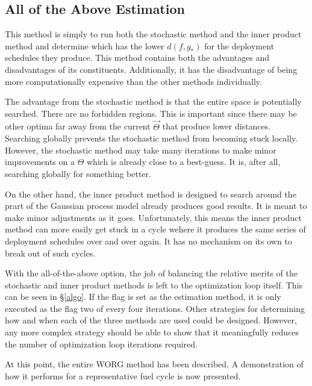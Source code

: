 \subsection{All of the Above Estimation}
\label{all}

This method is simply to run both the stochastic method and the inner product
method and determine which has the lower $d(f, g_*)$ for the deployment 
schedules they produce.  This method contains both the advantages and 
disadvantages of its constituents.  Additionally, it has the disadvantage 
of being more computationally expensive than the other methods individually.

The advantage from the stochastic method is that the entire space is 
potentially searched. There are no forbidden regions.
This is important since there may be other
optima far away from the current $\vec{\Theta}$ that produce lower distances.
Searching globally prevents the stochastic method from becoming stuck locally.
However, the stochastic method may take many iterations to 
make minor improvements on a $\Theta$ which is already close to a best-guess.
It is, after all, searching globally for something better.

On the other hand, the inner product method is designed to search around 
the prart of the Gaussian process model already produces good results. It
is meant to make minor adjustments as it goes.  Unfortunately, this means
the inner product method can more easily get stuck in a cycle  wehere it 
produces the same series of deployment schedules over and over again. 
It has no mechanism on its own to break out of such cycles.

With the all-of-the-above option, the job of balancing the relative merits
of the stochastic and inner product methods is left to the optimization 
loop itself.  This can be seen in \S\ref{algo}.  If the \allflag flag 
is set as the estimation method, it is only executed as the \allflag flag 
two of every four 
iterations.  Other strategies for determining how and when each of the 
three methods are used could be designed. However, any more complex strategy 
should be able to show that it meaningfully reduces the number of 
optimization loop iterations required.

At this point, the entire WORG method has been described. A
demonstration of how it performs for a representative fuel cycle is now
presented. 